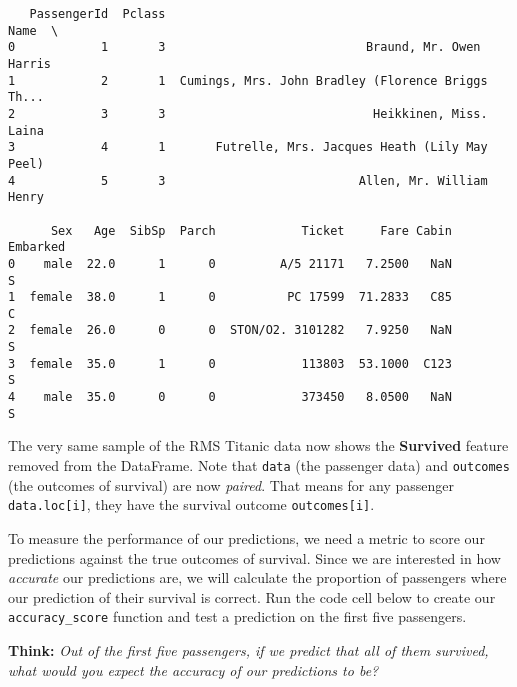 \documentclass[11pt]{article}
\begin{document}
    
    \begin{verbatim}
   PassengerId  Pclass                                               Name  \
0            1       3                            Braund, Mr. Owen Harris   
1            2       1  Cumings, Mrs. John Bradley (Florence Briggs Th...   
2            3       3                             Heikkinen, Miss. Laina   
3            4       1       Futrelle, Mrs. Jacques Heath (Lily May Peel)   
4            5       3                           Allen, Mr. William Henry   

      Sex   Age  SibSp  Parch            Ticket     Fare Cabin Embarked  
0    male  22.0      1      0         A/5 21171   7.2500   NaN        S  
1  female  38.0      1      0          PC 17599  71.2833   C85        C  
2  female  26.0      0      0  STON/O2. 3101282   7.9250   NaN        S  
3  female  35.0      1      0            113803  53.1000  C123        S  
4    male  35.0      0      0            373450   8.0500   NaN        S  
    \end{verbatim}

    
    The very same sample of the RMS Titanic data now shows the
\textbf{Survived} feature removed from the DataFrame. Note that
\texttt{data} (the passenger data) and \texttt{outcomes} (the outcomes
of survival) are now \emph{paired}. That means for any passenger
\texttt{data.loc{[}i{]}}, they have the survival outcome
\texttt{outcomes{[}i{]}}.

To measure the performance of our predictions, we need a metric to score
our predictions against the true outcomes of survival. Since we are
interested in how \emph{accurate} our predictions are, we will calculate
the proportion of passengers where our prediction of their survival is
correct. Run the code cell below to create our \texttt{accuracy\_score}
function and test a prediction on the first five passengers.

\textbf{Think:} \emph{Out of the first five passengers, if we predict
that all of them survived, what would you expect the accuracy of our
predictions to be?}
\end{document}
